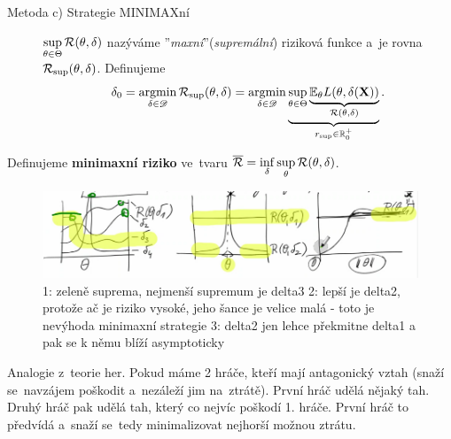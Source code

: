 \begin{description}
	\item[Metoda c) Strategie MINIMAXní] $\sup\limits_{\theta\in\Theta} \mathcal{R}(\theta,\delta)$ nazýváme ''\textit{maxní}''(\textit{supremální}) riziková funkce a~je rovna $\mathcal{R}_{\sup}(\theta,\delta)$. Definujeme 
	$$ \delta_0=\mathop{\mathrm{argmin}}\limits_{\delta\in\mathscr{D}}\mathcal{R}_{\sup}(\theta,\delta)=\mathop{\mathrm{argmin}}\limits_{\delta\in\mathscr{D}}\underbrace{\sup\limits_{\theta\in\Theta}\underbrace{\mathbb{E}_\theta L(\theta,\delta(\textbf{X}))}_{\mathcal{R}(\theta,\delta)}}_{r_{\sup}\in\mathbb{R}_0^+}.$$
\end{description}

\begin{define}
	Definujeme \textbf{minimaxní riziko} ve~tvaru $\overline{\mathcal{R}}=\inf\limits_\delta\sup\limits_\theta\mathcal{R}(\theta,\delta)$.
\end{define}
\newpage
\begin{figure}[h]
	\centering
	\includegraphics[width=0.95\linewidth]{pictures/P4_3}
	\caption{1: zeleně suprema, nejmenší supremum je delta3 2: lepší je delta2, protože ač je riziko vysoké, jeho šance je velice malá - toto je nevýhoda minimaxní strategie 3: delta2 jen lehce překmitne delta1 a pak se k němu blíží asymptoticky}
	\label{fig:p43}
\end{figure}



\begin{remark}
	Analogie z~teorie her. Pokud máme 2 hráče, kteří mají antagonický vztah (snaží se~navzájem poškodit a~nezáleží jim na~ztrátě). První hráč udělá nějaký tah. Druhý hráč pak udělá tah, který co nejvíc poškodí 1. hráče. První hráč to předvídá a~snaží se~tedy minimalizovat nejhorší možnou ztrátu.
\end{remark}

